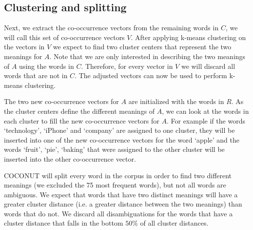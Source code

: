 \documentclass[11pt]{article}
\begin{document}
\subsection{Clustering and splitting}
Next, we extract the co-occurrence vectors from the remaining words in $C$, we will call this set of co-occurrence vectors $V$. After applying k-means clustering on the vectors in $V$ we expect to find two cluster centers that represent the two meanings for $A$. Note that we are only interested in describing the two meanings of $A$ using the words in $C$. Therefore, for every vector in $V$ we will discard all words that are not in $C$. The adjusted vectors can now be used to perform k-means clustering. 

The two new co-occurrence vectors for $A$ are initialized with the words in $R$. As the cluster centers define the different meanings of $A$, we can look at the words in each cluster to fill the new co-occurrence vectors for $A$. For example if the words `technology', `iPhone' and `company' are assigned to one cluster, they will be inserted into one of the new co-occurrence vectors for the word `apple' and the words `fruit', `pie', `baking' that were assigned to the other cluster will be inserted into the other co-occurrence vector. 

COCONUT will split every word in the corpus in order to find two different meanings (we excluded the 75 most frequent words), but not all words are ambiguous. We expect that words that have two distinct meanings will have a greater cluster distance (i.e. a greater distance between the two meanings) than words that do not. We discard all disambiguations for the words that have a cluster distance that falls in the bottom $50\%$ of all cluster distances.


\end{document}
